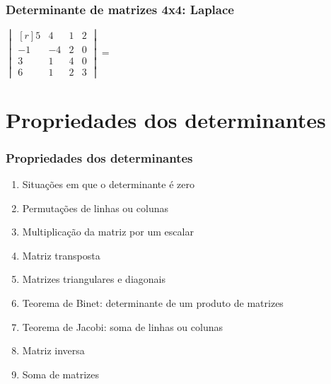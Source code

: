 \documentclass[pdftex, brazil, aspectratio=169]{beamer}
\begin{document}
\begin{frame}[t]
  \frametitle{Determinante de matrizes 4x4: Laplace}
  $\begin{vmatrix*}[r]
    5 & 4 & 1 & 2\\
    -1 & -4 & 2 & 0\\
    3 & 1 & 4 & 0\\
    6 & 1 & 2 & 3\end{vmatrix*} =$
\end{frame}


\section{Propriedades dos determinantes}

\begin{frame}[t]
  \frametitle{Propriedades dos determinantes}
  \begin{enumerate}
    \item Situações em que o determinante é zero
    \item Permutações de linhas ou colunas
    \item Multiplicação da matriz por um escalar
    \item Matriz transposta
    \item Matrizes triangulares e diagonais
    \item Teorema de Binet: determinante de um produto de matrizes
    \item Teorema de Jacobi: soma de linhas ou colunas
    \item Matriz inversa
    \item Soma de matrizes
  \end{enumerate}
\end{frame}
\end{document}

